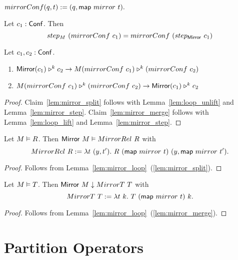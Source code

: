 \begin{definition}
  \label{def:mirrorConf}
  $mirrorConf(q,t) := (q, \mathsf{map}~mirror~t).$
\end{definition}


\begin{lemma}
  \label{lem:mirror_step}
  Let $c_1 : \mathsf{Conf}$.  Then
  \[ step_M~(mirrorConf~c_1) = mirrorConf~(step_{\mathsf{Mirror}}~c_1) \]
\end{lemma}

\begin{lemma}
  \label{lem:mirror_loop}
  Let $c_1, c_2 : \mathsf{Conf}$.
  \begin{enumerate}
  \item \label{lem:mirror_split}
    $ \mathsf{Mirror} (c_1) \mathrel{\triangleright}^k c_2 \rightarrow M (mirrorConf~c_1) \mathrel{\triangleright}^k (mirrorConf~c_2) $
  \item \label{lem:mirror_merge}
    $ M (mirrorConf~c_1) \mathrel{\triangleright}^k (mirrorConf~c_2) \rightarrow \mathsf{Mirror} (c_1) \mathrel{\triangleright}^k c_2 $
  \end{enumerate}
\end{lemma}
\begin{proof}
  Claim~\ref{lem:mirror_split} follows with Lemma~\ref{lem:loop_unlift} and Lemma~\ref{lem:mirror_step}.  Claim~\ref{lem:mirror_merge} follows with
  Lemma~\ref{lem:loop_lift} and Lemma~\ref{lem:mirror_step}.
\end{proof}

\begin{lemma}
  Let $M \mathrel{\vDash} R$.  Then $\mathsf{Mirror}~M \mathrel{\vDash} MirrorRel~R$ with
  \[
    MirrorRel~R := \lambda t~(y, t').~ R~(\mathsf{map}~mirror~t)~(y, \mathsf{map}~mirror~t').
  \]
\end{lemma}
\begin{proof}
  Follows from Lemma~\ref{lem:mirror_loop}~(\ref{lem:mirror_split}).
\end{proof}
\begin{lemma}
  Let $M \mathrel{\vDash} T$.  Then $\mathsf{Mirror}~M \mathrel{\downarrow} MirrorT~T$ with
  \[
    MirrorT~T := \lambda t~k.~ T~(\mathsf{map}~mirror~t)~k.
  \]
\end{lemma}
\begin{proof}
  Follows from Lemma~\ref{lem:mirror_loop}~(\ref{lem:mirror_merge}).
\end{proof}

\section{Partition Operators}
\label{sec:partition-op}

